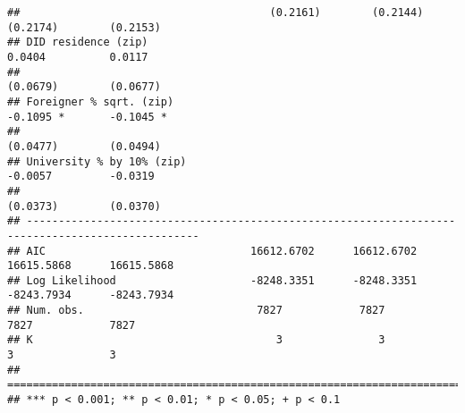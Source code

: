 \documentclass[
]{article}
\begin{document}
\begin{verbatim}
##                                       (0.2161)        (0.2144)        (0.2174)        (0.2153)   
## DID residence (zip)                                                    0.0404          0.0117    
##                                                                       (0.0679)        (0.0677)   
## Foreigner % sqrt. (zip)                                               -0.1095 *       -0.1045 *  
##                                                                       (0.0477)        (0.0494)   
## University % by 10% (zip)                                             -0.0057         -0.0319    
##                                                                       (0.0373)        (0.0370)   
## -------------------------------------------------------------------------------------------------
## AIC                                16612.6702      16612.6702      16615.5868      16615.5868    
## Log Likelihood                     -8248.3351      -8248.3351      -8243.7934      -8243.7934    
## Num. obs.                           7827            7827            7827            7827         
## K                                      3               3               3               3         
## =================================================================================================
## *** p < 0.001; ** p < 0.01; * p < 0.05; + p < 0.1
\end{verbatim}
\end{document}
